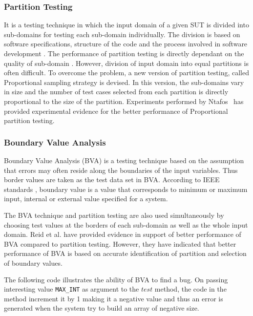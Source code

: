 \subsubsection{Partition Testing}
It is a testing technique in which the input domain of a given SUT is divided into sub-domains for testing each sub-domain individually. The division is based on software specifications, structure of the code and the process involved in software development \cite{hamlet1990}. The performance of partition testing is directly dependant on the quality of sub-domain \cite{weyuker1991analyzing}. However, division of input domain into equal partitions is often difficult. To overcome the problem, a new version of partition testing, called Proportional sampling strategy \cite{Chan1996} is devised. In this version, the sub-domains vary in size and the number of test cases selected from each partition is directly proportional to the size of the partition. Experiments performed by Ntafos~\cite{ntafos1998random} has provided experimental evidence for the better performance of Proportional partition testing.


\subsubsection{Boundary Value Analysis}
Boundary Value Analysis (BVA) is a testing technique based on the assumption that errors may often reside along the boundaries of the input variables. Thus border values are taken as the test data set in BVA. According to IEEE standards \cite{radatz1990ieee}, boundary value is a value that corresponds to minimum or maximum input, internal or external value specified for a system. 

The BVA technique and partition testing are also used simultaneously by choosing test values at the borders of each sub-domain as well as the whole input domain. Reid et al. \cite{reid1997empirical} have provided evidence in support of better performance of BVA compared to partition testing. However, they have indicated that better performance of BVA is based on accurate identification of partition and selection of boundary values.

 The following code illustrates the ability of BVA to find a bug.  On passing interesting value \verb+MAX_INT+ as argument to the $test$ method, the code in the method increment it by 1 making it a negative value and thus an error is generated when the system try to build an array of negative size.

